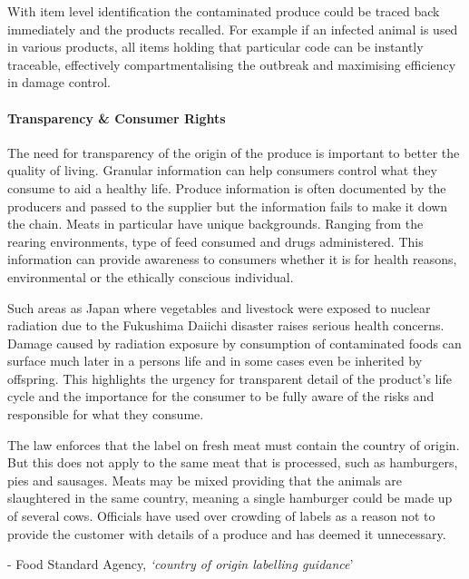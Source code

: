 \documentclass[a4paper, 11pt]{article}
\begin{document}
With item level identification the contaminated produce could be traced back immediately and the products recalled.\cite{rfidFood}\cite{rfidFood2} For example if an infected animal is used in various products, all items holding that particular code can be instantly traceable, effectively compartmentalising the outbreak and maximising efficiency in damage control.

\paragraph{Transparency \& Consumer Rights}

The need for transparency of the origin of the produce is important to better the quality of living. Granular information can help consumers control what they consume to aid a healthy life. Produce information is often documented by the producers and passed to the supplier but the information fails to make it down the chain.\cite{FSA} Meats in particular have unique backgrounds. Ranging from the rearing environments, type of feed consumed and drugs administered. This information can provide awareness to consumers whether it is for health reasons, environmental or the ethically conscious individual.

Such areas as Japan where vegetables and livestock were exposed to nuclear radiation due to the Fukushima Daiichi disaster raises serious health concerns. Damage caused by radiation exposure by consumption of contaminated foods can surface much later in a persons life and in some cases even be inherited by offspring. This highlights the urgency for transparent detail of the product's life cycle and the importance for the consumer to be fully aware of the risks and responsible for what they consume.\cite{fukushima}

The law enforces that the label on fresh meat must contain the country of origin. But this does not apply to the same meat that is processed, such as hamburgers, pies and sausages. Meats may be mixed providing that the animals are slaughtered in the same country, meaning a single hamburger could be made up of several cows.\cite{FSA} Officials have used over crowding of labels as a reason not to provide the customer with details of a produce and has deemed it unnecessary. 

\vspace{\baselineskip}
\begin{quoting}
- Food Standard Agency, \emph{`country of origin labelling guidance}'\cite{FSA}
\end{quoting}
\vspace{\baselineskip}
\end{document}
